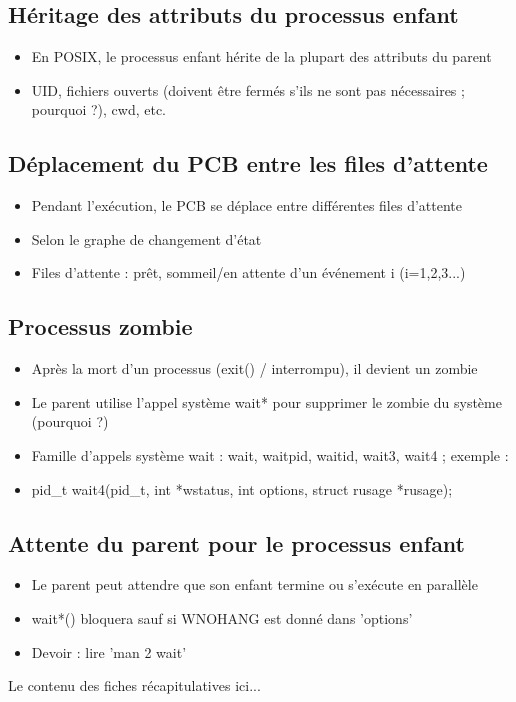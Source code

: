 \documentclass[12pt]{article}
\begin{document}
\subsection{Héritage des attributs du processus enfant}
\begin{itemize}
\item En POSIX, le processus enfant hérite de la plupart des attributs du parent
\item UID, fichiers ouverts (doivent être fermés s'ils ne sont pas nécessaires ; pourquoi ?), cwd, etc.
\end{itemize}

\subsection{Déplacement du PCB entre les files d'attente}
\begin{itemize}
\item Pendant l'exécution, le PCB se déplace entre différentes files d'attente
\item Selon le graphe de changement d'état
\item Files d'attente : prêt, sommeil/en attente d'un événement i (i=1,2,3...)
\end{itemize}

\subsection{Processus zombie}
\begin{itemize}
\item Après la mort d'un processus (exit() / interrompu), il devient un zombie
\item Le parent utilise l'appel système wait* pour supprimer le zombie du système (pourquoi ?)
\item Famille d'appels système wait : wait, waitpid, waitid, wait3, wait4 ; exemple :
\item pid\_t wait4(pid\_t, int *wstatus, int options, struct rusage *rusage);
\end{itemize}

\subsection{Attente du parent pour le processus enfant}
\begin{itemize}
\item Le parent peut attendre que son enfant termine ou s'exécute en parallèle
\item wait*() bloquera sauf si WNOHANG est donné dans 'options'
\item Devoir : lire 'man 2 wait'
\end{itemize}

\begin{tcolorbox}[title={title={Fiche Récapitulative}]
Le contenu des fiches récapitulatives ici...
\end{tcolorbox}
\end{document}
